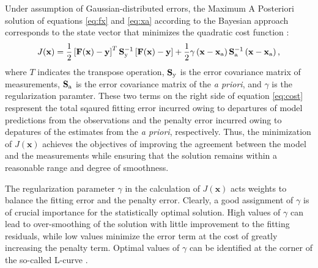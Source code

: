  Under assumption of Gaussian-distributed errors, the Maximum A Posteriori solution of
  equations \eqref{eq:fx} and \eqref{eq:xa} according to the Bayesian approach
 corresponds to the state vector that minimizes the quadratic cost function
 \citep{rodgers00}:
 \begin{equation} \label{eq:cost}
 J(\mathbf{x}) = \frac{1}{2} \left[ \mathbf{F(x)-y}\right]^T
                 \mathbf{S}_\text{y}^{-1} \left[ \mathbf{F(x)-y}\right]
               + \frac{1}{2} \gamma \left( \mathbf{x}-\mathbf{x}_\text{a} \right)
                 \mathbf{S}_\text{a}^{-1} \left( \mathbf{x}-\mathbf{x}_\text{a} \right) \mbox{,}
 \end{equation}
 where $T$ indicates the transpose operation, $\mathbf{S}_\text{y}$ is the error covariance matrix
 of measurements, $\mathbf{S}_\text{a}$ is the error covariance matrix of the \textit{a priori},
 and $\gamma$ is the regularization paramter. These two terms on the right side of
 equation \eqref{eq:cost} respresent the total sqaured fitting error incurred owing
 to departures of model predictions from the observations and the penalty error
 incurred owing to depatures of the estimates from the \textit{a priori}, respectively.
 Thus, the minimization of $J(\mathbf{x})$ achieves the objectives of improving the
 agreement between the model and the measurements while ensuring that the solution
 remains within a reasonable range and degree of smoothness.

 The regularization parameter $\gamma$ in the calculation of $J(\mathbf{x})$ acts weights
 to balance the fitting error and the penalty error. Clearly, a good assignment of
 $\gamma$ is of crucial importance for the statistically optimal solution. High values
 of $\gamma$ can lead to over-smoothing of the solution with little improvement to the
 fitting residuals, while low values minimize the error term at the cost of greatly
 increasing the penalty term. Optimal values of $\gamma$ can be identified at the
 corner of the so-called L-curve \citep{hansen98}.

